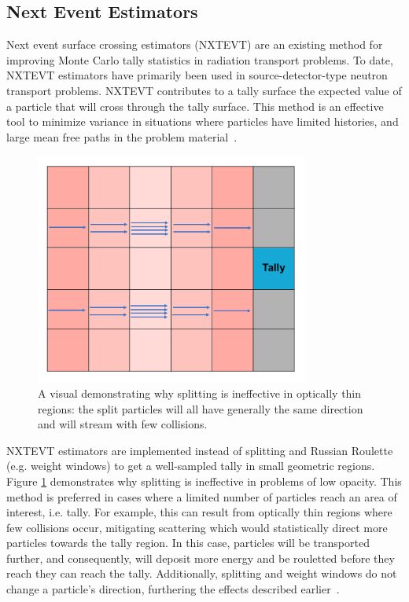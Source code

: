 \subsection{Next Event Estimators}
Next event surface crossing estimators (NXTEVT) are an existing method for improving Monte Carlo tally statistics in radiation transport problems. To date, NXTEVT estimators have primarily been used in source-detector-type neutron transport problems. NXTEVT contributes to a tally surface the expected value of a particle that will cross through the tally surface. This method is an effective tool to minimize variance in situations where particles have limited histories, and large mean free paths in the problem material~\cite{WD11, LL99, LL05}. 

\begin{figure} [h!]
	\centering
	\includegraphics[height=3in]{VarReduction/plots/nxtevt_visual.png}
	\caption{A visual demonstrating why splitting is ineffective in optically thin regions: the split particles will all have generally the same direction and will stream with few collisions.}
	\label{fig:nxtevt_visual}
\end{figure}

NXTEVT estimators are implemented instead of splitting and Russian Roulette (e.g. weight windows) to get a well-sampled tally in small geometric regions. Figure \ref{fig:nxtevt_visual} demonstrates why splitting is ineffective in problems of low opacity. This method is preferred in cases where a limited number of particles reach an area of interest, i.e. tally. For example, this can result from optically thin regions where few collisions occur, mitigating scattering which would statistically direct more particles towards the tally region. In this case, particles will be transported further, and consequently, will deposit more energy and be rouletted before they reach they can reach the tally. Additionally, splitting and weight windows do not change a particle's direction, furthering the effects described earlier~\cite{BF12}.

